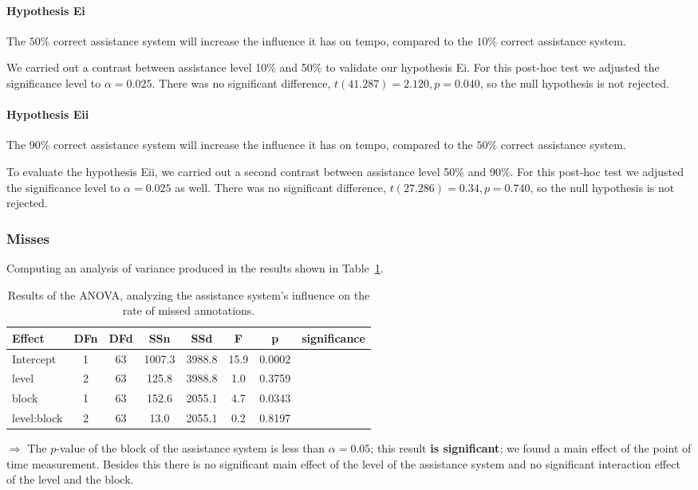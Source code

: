 		\paragraph{Hypothesis Ei}
		\lqq The \(50\%\) correct assistance system will increase the influence it has on tempo, compared to the \(10\%\) correct assistance system.\rqq

		We carried out a contrast between assistance level 10\% and 50\% to validate our hypothesis Ei. For this post-hoc test we adjusted the significance level to \(\alpha = 0.025\). There was no significant difference, \(t(41.287) = 2.120, p = 0.040\), so the null hypothesis is not rejected.

		\paragraph{Hypothesis Eii}
		\lqq The \(90\%\) correct assistance system will increase the influence it has on tempo, compared to the \(50\%\) correct assistance system.\rqq

		To evaluate the hypothesis Eii, we carried out a second contrast between assistance level 50\% and 90\%. For this post-hoc test we adjusted the significance level to \(\alpha = 0.025\) as well. There was no significant difference, \(t(27.286) = 0.34, p = 0.740\), so the null hypothesis is not rejected.



	\subsubsection{Misses}
		Computing an analysis of variance produced in the results shown in Table~\ref{tab:anovaMisses}.

		\begin{table}[H]\centering
			\caption{Results of the \ac{ANOVA}, analyzing the assistance system's influence on the rate of missed annotations.}
			\begin{tabular}{lccccccc}
				\toprule
				Effect & DFn & DFd & SSn & SSd & F & p & significance \\
				\midrule
				Intercept 	& 1 & 63 & 1007.3 & 3988.8 & 15.9 & 0.0002 & \Checkmark \\
				level				& 2 & 63 & 125.8 & 3988.8 & 1.0  & 0.3759 & \XSolidBrush \\
				block 			& 1 & 63 & 152.6  & 2055.1 & 4.7  & 0.0343 & \Checkmark  \\
				level:block & 2 & 63 & 13.0 & 2055.1 & 0.2 	& 0.8197 & \XSolidBrush \\
				\bottomrule
			\end{tabular}
			\label{tab:anovaMisses}
		\end{table}
		\(\Rightarrow\) The \(p\)-value of the block of the assistance system is less than \(\alpha = 0.05\); this result \textbf{is significant}; we found a main effect of the point of time measurement. Besides this there is no significant main effect of the level of the assistance system  and no significant interaction effect of the level and the block.
